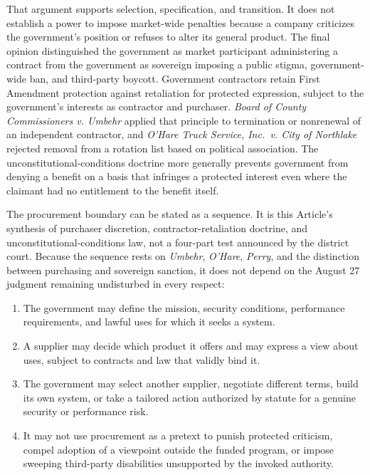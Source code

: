 That argument supports selection, specification, and transition. It does not establish a power to impose market-wide penalties because a company criticizes the government's position or refuses to alter its general product. The final opinion distinguished the government as market participant administering a contract from the government as sovereign imposing a public stigma, government-wide ban, and third-party boycott. Government contractors retain First Amendment protection against retaliation for protected expression, subject to the government's interests as contractor and purchaser. \emph{Board of County Commissioners v. Umbehr} applied that principle to termination or nonrenewal of an independent contractor, and \emph{O'Hare Truck Service, Inc.\ v. City of Northlake} rejected removal from a rotation list based on political association. The unconstitutional-conditions doctrine more generally prevents government from denying a benefit on a basis that infringes a protected interest even where the claimant had no entitlement to the benefit itself.

The procurement boundary can be stated as a sequence. It is this Article's synthesis of purchaser discretion, contractor-retaliation doctrine, and unconstitutional-conditions law, not a four-part test announced by the district court. Because the sequence rests on \emph{Umbehr}, \emph{O'Hare}, \emph{Perry}, and the distinction between purchasing and sovereign sanction, it does not depend on the August 27 judgment remaining undisturbed in every respect:

\begin{enumerate}[leftmargin=2.2em]
\item The government may define the mission, security conditions, performance requirements, and lawful uses for which it seeks a system.
\item A supplier may decide which product it offers and may express a view about uses, subject to contracts and law that validly bind it.
\item The government may select another supplier, negotiate different terms, build its own system, or take a tailored action authorized by statute for a genuine security or performance risk.
\item It may not use procurement as a pretext to punish protected criticism, compel adoption of a viewpoint outside the funded program, or impose sweeping third-party disabilities unsupported by the invoked authority.
\end{enumerate}

